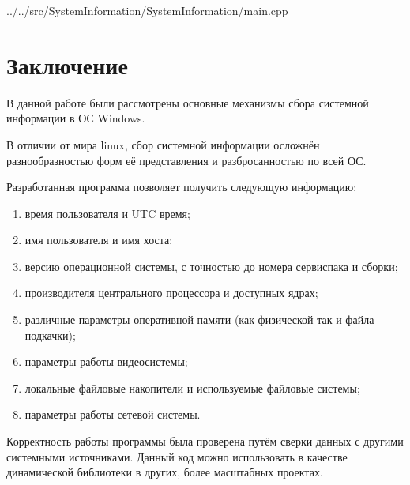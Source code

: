 \documentclass[a4paper, 12pt]{report}		%
\begin{document}

{../../src/SystemInformation/SystemInformation/main.cpp}

\chapter*{Заключение}

\vspace{1em}

В данной работе были рассмотрены основные механизмы сбора системной информации в ОС Windows.
\vspace{1em}

В отличии от мира linux, сбор системной информации осложнён разнообразностью форм её представления и разбросанностью по всей ОС.
\vspace{1em}

Разработанная программа позволяет получить следующую информацию:
\begin{enumerate}
\item время пользователя и UTC время;
\item имя пользователя и имя хоста;
\item версию операционной системы, с точностью до номера сервиспака и сборки;
\item производителя центрального процессора и доступных ядрах;
\item различные параметры оперативной памяти (как физической так и файла подкачки);
\item параметры работы видеосистемы;
\item локальные файловые накопители и используемые файловые системы;
\item параметры работы сетевой системы.
\end{enumerate}
\vspace{1em}

Корректность работы программы была проверена путём сверки данных с другими системными источниками. Данный код можно использовать в качестве динамической библиотеки в других, более масштабных проектах.
\end{document}
